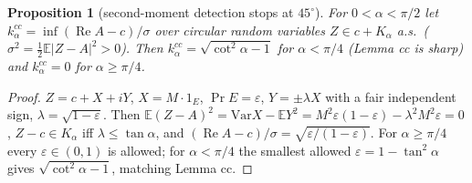 \documentclass[11pt]{article}
\newtheorem{proposition}[theorem]{Proposition}
\theoremstyle{remark}
\newcommand{\E}{\mathbb E}
\newcommand{\Re}{\operatorname{Re}}
\renewcommand{\Re}{\operatorname{Re}}
\begin{document}
\begin{proposition}[second-moment detection stops at $45^\circ$]\label{prop:OB}
For $0<\alpha<\pi/2$ let $k^{cc}_\alpha=\inf(\Re A-c)/\sigma$ over circular random variables $Z\in c+K_\alpha$ a.s.\ ($\sigma^2=\frac12\E|Z-A|^2>0$).
Then $k^{cc}_\alpha=\sqrt{\cot^2\alpha-1}$ for $\alpha<\pi/4$ (Lemma cc is sharp) and $k^{cc}_\alpha=0$ for $\alpha\ge\pi/4$.
\end{proposition}
\begin{proof}
$Z=c+X+iY$, $X=M\cdot1_E$, $\Pr E=\varepsilon$, $Y=\pm\lambda X$ with a fair independent sign, $\lambda=\sqrt{1-\varepsilon}$.  Then
$\E(Z-A)^2=\mathrm{Var}X-\E Y^2=M^2\varepsilon(1-\varepsilon)-\lambda^2M^2\varepsilon=0$, $Z-c\in K_\alpha$ iff $\lambda\le\tan\alpha$, and
$(\Re A-c)/\sigma=\sqrt{\varepsilon/(1-\varepsilon)}$.  For $\alpha\ge\pi/4$ every $\varepsilon\in(0,1)$ is allowed; for $\alpha<\pi/4$ the
smallest allowed $\varepsilon=1-\tan^2\alpha$ gives $\sqrt{\cot^2\alpha-1}$, matching Lemma cc.
\end{proof}
\end{document}
